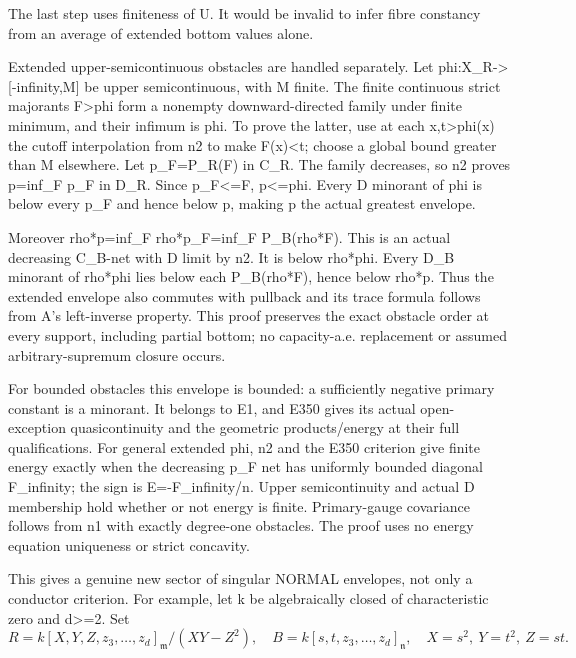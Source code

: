 \documentclass[11pt]{article}
\begin{document}
The last step uses finiteness of U. It would be invalid to infer fibre constancy from an average of extended bottom values alone.

Extended upper-semicontinuous obstacles are handled separately. Let phi:X\_R->[-infinity,M] be upper semicontinuous, with M finite. The finite continuous strict majorants F>phi form a nonempty downward-directed family under finite minimum, and their infimum is phi. To prove the latter, use at each x,t>phi(x) the cutoff interpolation from n2 to make F(x)<t; choose a global bound greater than M elsewhere. Let p\_F=P\_R(F) in C\_R. The family decreases, so n2 proves p=inf\_F p\_F in D\_R. Since p\_F<=F, p<=phi. Every D minorant of phi is below every p\_F and hence below p, making p the actual greatest envelope.

Moreover rho*p=inf\_F rho*p\_F=inf\_F P\_B(rho*F). This is an actual decreasing C\_B-net with D limit by n2. It is below rho*phi. Every D\_B minorant of rho*phi lies below each P\_B(rho*F), hence below rho*p. Thus the extended envelope also commutes with pullback and its trace formula follows from A's left-inverse property. This proof preserves the exact obstacle order at every support, including partial bottom; no capacity-a.e. replacement or assumed arbitrary-supremum closure occurs.

For bounded obstacles this envelope is bounded: a sufficiently negative primary constant is a minorant. It belongs to E1, and E350 gives its actual open-exception quasicontinuity and the geometric products/energy at their full qualifications. For general extended phi, n2 and the E350 criterion give finite energy exactly when the decreasing p\_F net has uniformly bounded diagonal F\_infinity; the sign is E=-F\_infinity/n. Upper semicontinuity and actual D membership hold whether or not energy is finite. Primary-gauge covariance follows from n1 with exactly degree-one obstacles. The proof uses no energy equation uniqueness or strict concavity.

This gives a genuine new sector of singular NORMAL envelopes, not only a conductor criterion. For example, let k be algebraically closed of characteristic zero and d>=2. Set
\[
R=k[X,Y,Z,z_3,\ldots,z_d]_{\mathfrak m}/(XY-Z^2),\quad
B=k[s,t,z_3,\ldots,z_d]_{\mathfrak n},
\quad X=s^2,\ Y=t^2,\ Z=st.
\]
\end{document}
